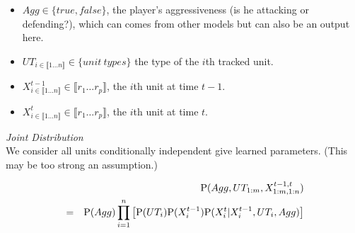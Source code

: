 \begin{itemize}
    \item $Agg \in \{true,false\}$, the player's aggressiveness (is he attacking or defending?), which can comes from other models but can also be an output here. 
    \item $UT_{i \in \llbracket 1\dots n \rrbracket} \in \{unit\ types\}$ the type of the $i$th tracked unit.
    \item $X^{t-1}_{i \in \llbracket 1\dots n \rrbracket} \in \llbracket r_1 \dots r_p \rrbracket$, the $i$th unit at time $t-1$.
    \item $X^{t}_{i \in \llbracket 1\dots n \rrbracket} \in \llbracket r_1 \dots r_p \rrbracket$, the $i$th unit at time $t$.
\end{itemize}


\vspace{0.3cm}
\textit{Joint Distribution}\\
We consider all units conditionally independent give learned parameters. (This may be too strong an assumption.) %

\begin{eqnarray}
& & \mathrm{P}(Agg, UT_{1:m}, X^{t-1,t}_{1:m,1:n}) \\
& = & \mathrm{P}(Agg)\prod_{i=1}^{n} \left[ \mathrm{P}(UT_{i}) \mathrm{P}(X^{t-1}_{i}) \mathrm{P}(X^t_{i}|X^{t-1}_{i},UT_i,Agg)\right]
\end{eqnarray}

